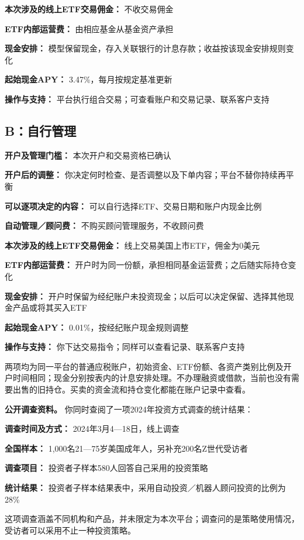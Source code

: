 \documentclass[UTF8,fontset=none,11pt,a4paper]{ctexart}
\begin{document}
\textbf{本次涉及的线上ETF交易佣金：} 不收交易佣金


\textbf{ETF内部运营费：} 由相应基金从基金资产承担


\textbf{现金安排：} 模型保留现金，存入关联银行的计息存款；收益按该现金安排规则变化


\textbf{起始现金APY：} 3.47\%，每月按规定基准更新


\textbf{操作与支持：} 平台执行组合交易；可查看账户和交易记录、联系客户支持


\subsection*{B：自行管理}
\textbf{开户及管理门槛：} 本次开户和交易资格已确认


\textbf{开户后的调整：} 你决定何时检查、是否调整以及下单内容；平台不替你持续再平衡


\textbf{可以逐项决定的内容：} 可以自行选择ETF、交易日期和账户内现金比例


\textbf{自动管理／顾问费：} 不购买顾问管理服务，不收顾问费


\textbf{本次涉及的线上ETF交易佣金：} 线上交易美国上市ETF，佣金为0美元


\textbf{ETF内部运营费：} 开户时为同一份额，承担相同基金运营费；之后随实际持仓变化


\textbf{现金安排：} 开户时保留为经纪账户未投资现金；以后可以决定保留、选择其他现金产品或将其买入ETF


\textbf{起始现金APY：} 0.01\%，按经纪账户现金规则调整


\textbf{操作与支持：} 你下达交易指令；同样可以查看记录、联系客户支持


两项均为同一平台的普通应税账户，初始资金、ETF份额、各资产类别比例及开户时间相同；现金分别按表内的计息安排处理。不办理融资或借款，当前也没有需要出售的旧持仓。买卖的资金流和持仓变化都能在账户记录中查看。


\textbf{公开调查资料。} 你同时查阅了一项2024年投资方式调查的统计结果：


\textbf{调查时间及方式：} 2024年3月4—18日，线上调查


\textbf{全国样本：} 1,000名21—75岁美国成年人，另补充200名Z世代受访者


\textbf{调查项目：} 投资者子样本580人回答自己采用的投资策略


\textbf{统计结果：} 投资者子样本结果表中，采用自动投资／机器人顾问投资的比例为28\%


这项调查涵盖不同机构和产品，并未限定为本次平台；调查问的是策略使用情况，受访者可以采用不止一种投资策略。
\end{document}
